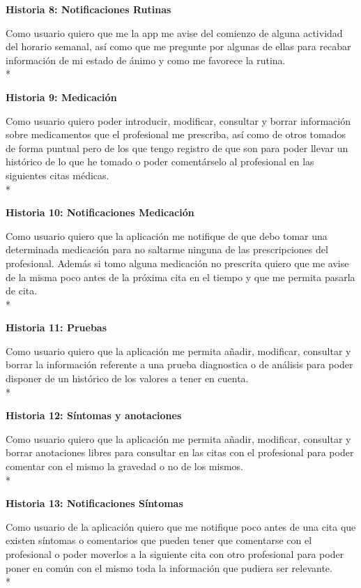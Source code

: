 \documentclass[../pfc.tex]{subfiles}
\begin{document}
	
	\textbf{Historia 8: Notificaciones Rutinas}
	
		Como usuario quiero que me la app me avise del comienzo de alguna actividad del horario semanal, así como que me pregunte por algunas de ellas para recabar información de mi estado de ánimo y como me favorece la rutina. \\*
	
	
	\textbf{Historia 9: Medicación}
	
		Como usuario quiero poder introducir, modificar, consultar y borrar información sobre medicamentos que el profesional me prescriba, así como de otros tomados de forma puntual pero de los que tengo registro de que son para poder llevar un histórico de lo que he tomado o poder comentárselo al profesional en las siguientes citas médicas.\\*
	
	
	\textbf{Historia 10: Notificaciones Medicación}
	
		Como usuario quiero que la aplicación me notifique de que debo tomar una determinada medicación para no saltarme ninguna de las prescripciones del profesional. Además si tomo alguna medicación no prescrita quiero que me avise de la misma poco antes de la próxima cita en el tiempo y que me permita pasarla de cita.\\*
	
	
	\textbf{Historia 11: Pruebas}
	
		Como usuario quiero que la aplicación me permita añadir, modificar, consultar y borrar la información referente a una prueba diagnostica o de análisis para poder disponer de un histórico de los valores a tener en cuenta. \\*
	
	
	\textbf{Historia 12: Síntomas y anotaciones}
	
		Como usuario quiero que la aplicación me permita añadir, modificar, consultar y borrar anotaciones libres para consultar en las citas con el profesional para poder comentar con el mismo la gravedad o no de los mismos.\\*
	

	\textbf{Historia 13: Notificaciones Síntomas}
	
		Como usuario de la aplicación quiero que me notifique poco antes de una cita que existen síntomas o comentarios que pueden tener que comentarse con el profesional o poder moverlos a la siguiente cita con otro profesional para poder poner en común con el mismo toda la información que pudiera ser relevante.\\*
	
\end{document}
